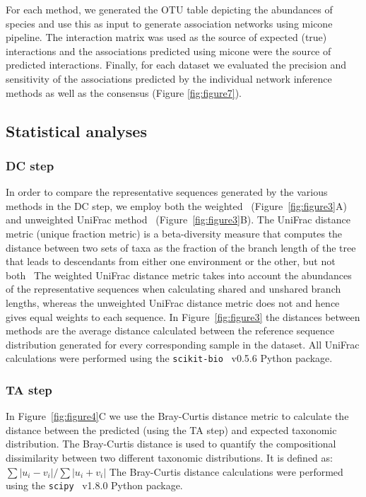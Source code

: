   For each method, we generated the OTU table depicting the abundances of species and use this as input to generate association networks using \ac{micone} pipeline.
  The interaction matrix was used as the source of expected (true) interactions and the associations predicted using \ac{micone} were the source of predicted interactions.
  Finally, for each dataset we evaluated the precision and sensitivity of the associations predicted by the individual network inference methods as well as the consensus (Figure \ref{fig:figure7}).

  \subsection*{Statistical analyses}
  \vspace{-5mm}

  \subsubsection*{DC step}
  In order to compare the representative sequences generated by the various methods in the DC step, we employ both the weighted~\cite{Lozupone2007} (Figure~\ref{fig:figure3}A) and unweighted UniFrac method~\cite{Lozupone2005} (Figure~\ref{fig:figure3}B).
  The UniFrac distance metric (unique fraction metric) is a beta-diversity measure that computes the distance between two sets of taxa as the fraction of the branch length of the tree that leads to descendants from either one environment or the other, but not both~\cite{Lozupone2005}
  The weighted UniFrac distance metric takes into account the abundances of the representative sequences when calculating shared and unshared branch lengths, whereas the unweighted UniFrac distance metric does not and hence gives equal weights to each sequence.
  In Figure~\ref{fig:figure3} the distances between methods are the average distance calculated between the reference sequence distribution generated for every corresponding sample in the dataset.
  All UniFrac calculations were performed using the \texttt{scikit-bio}~\cite{thescikit-biodevelopmentteamScikitbioBioinformaticsLibrary2022} v0.5.6 Python package.

  \subsubsection*{TA step}
  In Figure~\ref{fig:figure4}C we use the Bray-Curtis distance metric to calculate the distance between the predicted (using the TA step) and expected taxonomic distribution.
  The Bray-Curtis distance is used to quantify the compositional dissimilarity between two different taxonomic distributions.
  It is defined as: $\sum{|u_i-v_i|} / \sum{|u_i+v_i|}$
  The Bray-Curtis distance calculations were performed using the \texttt{scipy}~\cite{virtanenSciPyFundamentalAlgorithms2020} v1.8.0 Python package.

